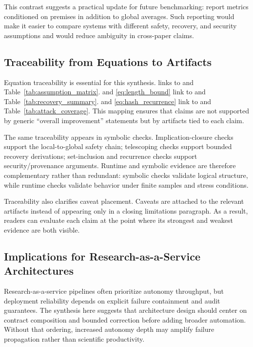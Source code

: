 \documentclass{article} %
\begin{document}
This contrast suggests a practical update for future benchmarking: report metrics conditioned on premises in addition to global averages. Such reporting would make it easier to compare systems with different safety, recovery, and security assumptions and would reduce ambiguity in cross-paper claims.

\subsection{Traceability from Equations to Artifacts}
Equation traceability is essential for this synthesis.  links to  and Table~\ref{tab:assumption_matrix}.  and \eqref{eq:length_bound} link to  and Table~\ref{tab:recovery_summary}.  and \eqref{eq:hash_recurrence} link to  and Table~\ref{tab:attack_coverage}. This mapping ensures that claims are not supported by generic ``overall improvement'' statements but by artifacts tied to each claim.

The same traceability appears in symbolic checks. Implication-closure checks support the local-to-global safety chain; telescoping checks support bounded recovery derivations; set-inclusion and recurrence checks support security/provenance arguments. Runtime and symbolic evidence are therefore complementary rather than redundant: symbolic checks validate logical structure, while runtime checks validate behavior under finite samples and stress conditions.

Traceability also clarifies caveat placement. Caveats are attached to the relevant artifacts instead of appearing only in a closing limitations paragraph. As a result, readers can evaluate each claim at the point where its strongest and weakest evidence are both visible.

\subsection{Implications for Research-as-a-Service Architectures}
Research-as-a-service pipelines often prioritize autonomy throughput, but deployment reliability depends on explicit failure containment and audit guarantees. The synthesis here suggests that architecture design should center on contract composition and bounded correction before adding broader automation. Without that ordering, increased autonomy depth may amplify failure propagation rather than scientific productivity.
\end{document}
